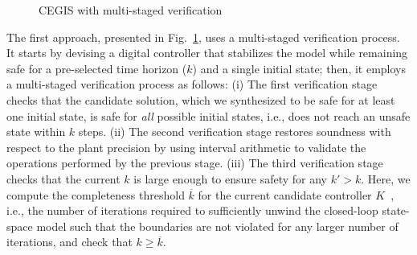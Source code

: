 \documentclass[10pt,conference]{IEEEtran}
\begin{document}
\begin{figure}[htb]
{{
}}
\caption{CEGIS with multi-staged verification}
\label{fig:CEGIS-precision-increment}
\end{figure}


The first approach, presented in Fig.~\ref{fig:CEGIS-precision-increment}, 
uses a multi-staged verification process. 
It starts by devising a digital controller that stabilizes the model while remaining safe for a
pre-selected time horizon ($k$) and a single initial state; then, it
employs a multi-staged verification process as follows:
(i) The first verification stage checks that the candidate
solution, which we synthesized to be safe for at least one initial
state, is safe for \emph{all} possible initial states, i.e., does not reach
an unsafe state within $k$ steps.
(ii) The second verification stage 
 restores soundness with respect to the plant precision
by using interval arithmetic \cite{moore1966interval} to validate the 
operations performed by the previous stage. 
(iii) The third verification stage checks that the current
$k$ is large enough to ensure safety for any $k'{>}k$.  Here, we compute the
completeness threshold $\overline{k}$ for the current candidate controller 
$K$~\cite{abatecav2017}, i.e., the number of
iterations required to sufficiently unwind the closed-loop state-space
model such that the boundaries are not violated for any larger number of
iterations, and
check that $k{\geq}\overline{k}$.
\end{document}
